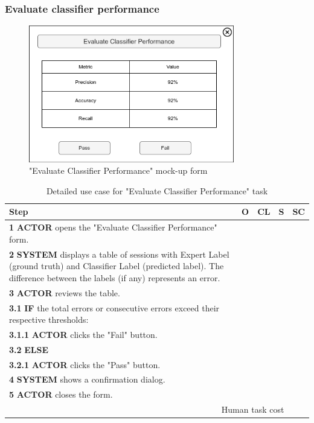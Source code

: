 \subsubsection{Evaluate classifier performance}

\begin{figure}[H]
\centering
\includegraphics[width=0.8\textwidth]{figures/evaluate_classifier_performance.png}
\caption{"Evaluate Classifier Performance" mock-up form}
\end{figure}

\begin{table}[H]
\centering
\begin{tabularx}{\textwidth}{|X|c|c|c|c|}
\hline
\textbf{Step} & \textbf{O} & \textbf{CL} & \textbf{S} & \textbf{SC} \\
\hline
\textbf{1} \textbf{ACTOR} opens the "Evaluate Classifier Performance" form. & & & & \\
\hline
\textbf{2} \textbf{SYSTEM} displays a table of sessions with Expert Label (ground truth) and Classifier Label (predicted label). 
The difference between the labels (if any) represents an error. & & & & \\
\hline
\textbf{3} \textbf{ACTOR} reviews the table. & & & & \\
\hline
\textbf{3.1} \textbf{IF} the total errors or consecutive errors exceed their respective thresholds: & & & & \\
\hline
\textbf{3.1.1} \textbf{ACTOR} clicks the "Fail" button. & & & & \\
\hline
\textbf{3.2} \textbf{ELSE} & & & & \\
\hline
\textbf{3.2.1} \textbf{ACTOR} clicks the "Pass" button. & & & & \\
\hline
\textbf{4} \textbf{SYSTEM} shows a confirmation dialog. & & & & \\
\hline
\textbf{5} \textbf{ACTOR} closes the form. & & & & \\
\hline
\multicolumn{4}{|r|}{Human task cost} & \\
\hline
\end{tabularx}
\caption{Detailed use case for "Evaluate Classifier Performance" task}
\label{table:evaluate_classifier_performance}
\end{table}
